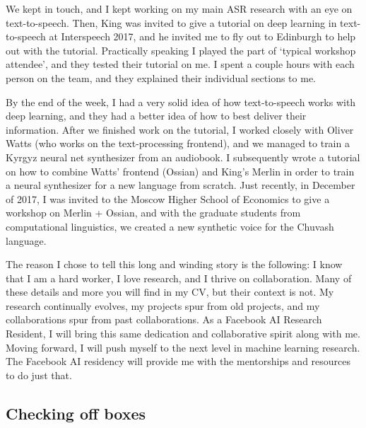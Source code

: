 \documentclass[12pt,a4paper]{article}
\begin{document}
We kept in touch, and I kept working on my main ASR research with an eye on text-to-speech. Then, King was invited to give a tutorial on deep learning in text-to-speech at Interspeech 2017, and he invited me to fly out to Edinburgh to help out with the tutorial. Practically speaking I played the part of `typical workshop attendee', and they tested their tutorial on me. I spent a couple hours with each person on the team, and they explained their individual sections to me.

By the end of the week, I had a very solid idea of how text-to-speech works with deep learning, and they had a better idea of how to best deliver their information. After we finished work on the tutorial, I worked closely with Oliver Watts (who works on the text-processing frontend), and we managed to train a Kyrgyz neural net synthesizer from an audiobook. I subsequently wrote a tutorial on how to combine Watts' frontend (Ossian) and King's Merlin in order to train a neural synthesizer for a new language from scratch. Just recently, in December of 2017, I was invited to the Moscow Higher School of Economics to give a workshop on Merlin + Ossian, and with the graduate students from computational linguistics, we created a new synthetic voice for the Chuvash language.

The reason I chose to tell this long and winding story is the following: I know that I am a hard worker, I love research, and I thrive on collaboration. Many of these details and more you will find in my CV, but their context is not. My research continually evolves, my projects spur from old projects, and my collaborations spur from past collaborations. As a Facebook AI Research Resident, I will bring this same dedication and collaborative spirit along with me. Moving forward, I will push myself to the next level in machine learning research. The Facebook AI residency will provide me with the mentorships and resources to do just that.

\subsection*{Checking off boxes}
\end{document}
